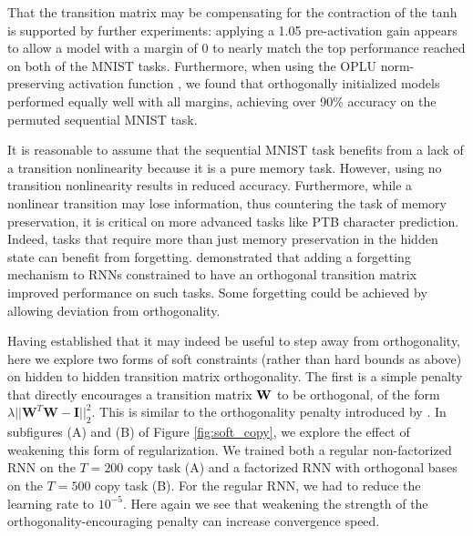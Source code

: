 \documentclass{article} %
\begin{document}
That the transition matrix may be compensating for the contraction of the tanh is supported by further experiments: applying a 1.05 pre-activation gain appears to allow a model with a margin of 0 to nearly match the top performance reached on both of the MNIST tasks. Furthermore, when using the OPLU norm-preserving activation function \citep{chernodub2016norm}, we found that orthogonally initialized models performed equally well with all margins, achieving over 90\% accuracy on the permuted sequential MNIST task.

It is reasonable to assume that the sequential MNIST task benefits from a lack of a transition nonlinearity because it is a pure memory task. However, using no transition nonlinearity results in reduced accuracy. Furthermore, while a nonlinear transition may lose information, thus countering the task of memory preservation, it is critical on more advanced tasks like PTB character prediction. Indeed, tasks that require more than just memory preservation in the hidden state can benefit from forgetting. \citet{jing2017gated} demonstrated that adding a forgetting mechanism to RNNs constrained to have an orthogonal transition matrix improved performance on such tasks. Some forgetting could be achieved by allowing deviation from orthogonality.

Having established that it may indeed be useful to step away from orthogonality, here we explore two forms of soft constraints (rather than hard bounds as above) on hidden to hidden transition matrix orthogonality. The first is a simple penalty that directly encourages a transition matrix $\bf{W}$ to be orthogonal, of the form
$\lambda||\mathbf{W}^T \mathbf{W} - \mathbf{I}||_2^2$.
This is similar to the orthogonality penalty introduced by \citet{henaff2016orthogonal}. In subfigures (A) and (B) of Figure \ref{fig:soft_copy}, we explore the effect of weakening this form of regularization. We trained both a regular non-factorized RNN on the $\mathit{T}=200$ copy task (A) and a factorized RNN with orthogonal bases on the $\mathit{T}=500$ copy task (B). For the regular RNN, we had to reduce the learning rate to $10^{-5}$. Here again we see that weakening the strength of the orthogonality-encouraging penalty can increase convergence speed.
\end{document}
